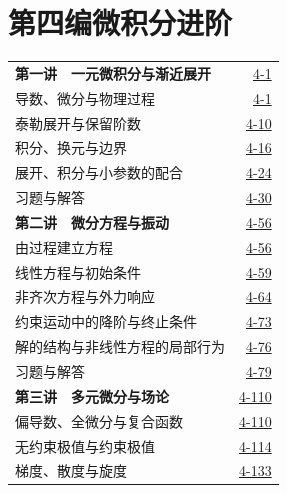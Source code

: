 \section*{第四编\quad 微积分进阶}
\begin{longtable}{@{}p{}r@{}}
\textbf{第一讲　一元微积分与渐近展开}&\href{course-page:4:3}{4-1}\\[2pt]
\hspace{1em}导数、微分与物理过程&\href{course-page:4:3}{4-1}\\[2pt]
\hspace{1em}泰勒展开与保留阶数&\href{course-page:4:12}{4-10}\\[2pt]
\hspace{1em}积分、换元与边界&\href{course-page:4:18}{4-16}\\[2pt]
\hspace{1em}展开、积分与小参数的配合&\href{course-page:4:26}{4-24}\\[2pt]
\hspace{1em}习题与解答&\href{course-page:4:32}{4-30}\\[2pt]
\textbf{第二讲　微分方程与振动}&\href{course-page:4:58}{4-56}\\[2pt]
\hspace{1em}由过程建立方程&\href{course-page:4:58}{4-56}\\[2pt]
\hspace{1em}线性方程与初始条件&\href{course-page:4:61}{4-59}\\[2pt]
\hspace{1em}非齐次方程与外力响应&\href{course-page:4:66}{4-64}\\[2pt]
\hspace{1em}约束运动中的降阶与终止条件&\href{course-page:4:75}{4-73}\\[2pt]
\hspace{1em}解的结构与非线性方程的局部行为&\href{course-page:4:78}{4-76}\\[2pt]
\hspace{1em}习题与解答&\href{course-page:4:81}{4-79}\\[2pt]
\textbf{第三讲　多元微分与场论}&\href{course-page:4:112}{4-110}\\[2pt]
\hspace{1em}偏导数、全微分与复合函数&\href{course-page:4:112}{4-110}\\[2pt]
\hspace{1em}无约束极值与约束极值&\href{course-page:4:116}{4-114}\\[2pt]
\hspace{1em}梯度、散度与旋度&\href{course-page:4:135}{4-133}\\[2pt]

\end{longtable}
